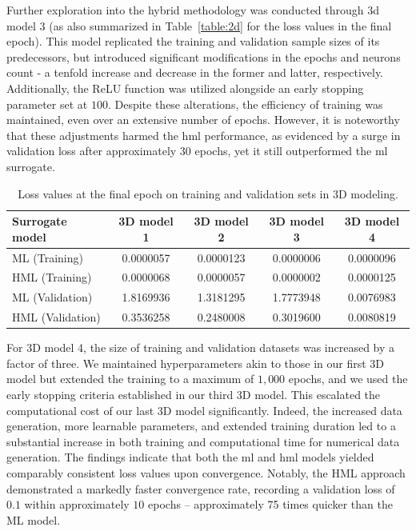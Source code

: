 \documentclass[12pt,a4paper]{report}
\begin{document}
Further exploration into the hybrid methodology was conducted through \ac{3d} model $3$ (as also summarized in Table~\ref{table:2d} for the loss values in the final epoch). This model replicated the training and validation sample sizes of its predecessors, but introduced significant modifications in the epochs and neurons count - a tenfold increase and decrease in the former and latter, respectively. Additionally, the ReLU function was utilized alongside an early stopping parameter set at $100$. Despite these alterations, the efficiency of training was maintained, even over an extensive number of epochs. However, it is noteworthy that these adjustments harmed the \ac{hml} performance, as evidenced by a surge in validation loss after approximately $30$ epochs, yet it still outperformed the \ac{ml} surrogate.
%
\begin{table}
\centering
\caption{Loss values at the final epoch on training and validation sets in 3D modeling.\label{table:3d}}
\begin{tabular}{lcccc}
\toprule
\textbf{Surrogate model} &  \textbf{3D model 1} &  \textbf{3D model 2} &  \textbf{3D model 3} &  \textbf{3D model 4} \\
\midrule
ML (Training)   &   0.0000057 &   0.0000123 &   0.0000006 &   0.0000096 \\
HML (Training)  &   0.0000068 &   0.0000057 &   0.0000002 &   0.0000125 \\
ML (Validation) &   1.8169936 &   1.3181295 &   1.7773948 &   0.0076983 \\
HML (Validation)&   0.3536258 &   0.2480008 &   0.3019600 &   0.0080819 \\
\bottomrule
\end{tabular}
\end{table}


For 3D model 4, the size of training and validation datasets was increased by a factor of three. We maintained hyperparameters akin to those in our first 3D model but extended the training to a maximum of $1,000$ epochs, and we used the early stopping criteria established in our third 3D model. This escalated the computational cost of our last 3D model significantly. Indeed, the increased data generation, more learnable parameters, and extended training duration led to a substantial increase in both training and computational time for numerical data generation. The findings indicate that both the \ac{ml} and \ac{hml} models yielded comparably consistent loss values upon convergence. Notably, the HML approach demonstrated a markedly faster convergence rate, recording a validation loss of $0.1$ within approximately $10$ epochs – approximately 75 times quicker than the ML model.
\end{document}
